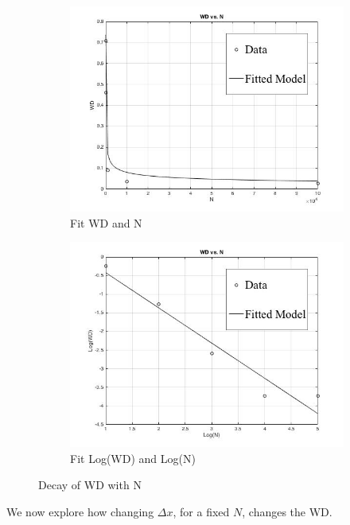 \documentclass[10pt]{article}
\begin{document}
\begin{figure}[H]
\centering
\begin{subfigure}{.5\textwidth}
  \centering
  \includegraphics[width=.9\linewidth]{WDVSN1D.jpg}
  \caption{Fit WD and N}
  \label{fig:FittingError}
\end{subfigure}%
\begin{subfigure}{.5\textwidth}
  \centering
  \includegraphics[width=.9\linewidth]{LogWDVSN1D.jpg}
  \caption{Fit Log(WD) and Log(N)}
  \label{fig: FittingLogError}
\end{subfigure}
\caption{Decay of WD with N}
\label{fig:test}
\end{figure}

\noindent We now explore how changing $\Delta x$, for a fixed $N$, changes the WD. 
\end{document}
